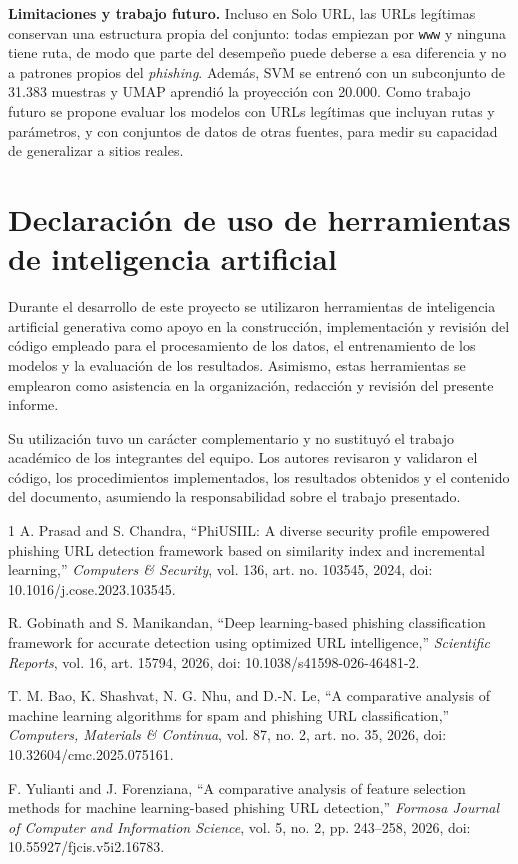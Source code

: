 \documentclass[journal]{IEEEtran}
\begin{document}
\textbf{Limitaciones y trabajo futuro.} Incluso en Solo URL, las URLs legítimas conservan una
estructura propia del conjunto: todas empiezan por \texttt{www} y ninguna tiene ruta, de modo que
parte del desempeño puede deberse a esa diferencia y no a patrones propios del \textit{phishing}.
Además, SVM se entrenó con un subconjunto de 31.383 muestras y UMAP aprendió la proyección con
20.000. Como trabajo futuro se propone evaluar los modelos con URLs legítimas que incluyan rutas y
parámetros, y con conjuntos de datos de otras fuentes, para medir su capacidad de generalizar a
sitios reales.


\section{Declaración de uso de herramientas de inteligencia artificial}
Durante el desarrollo de este proyecto se utilizaron herramientas de inteligencia
artificial generativa como apoyo en la construcción, implementación y revisión del
código empleado para el procesamiento de los datos, el entrenamiento de los modelos
y la evaluación de los resultados. Asimismo, estas herramientas se emplearon como
asistencia en la organización, redacción y revisión del presente informe.

Su utilización tuvo un carácter complementario y no sustituyó el trabajo académico
de los integrantes del equipo. Los autores revisaron y validaron el código, los
procedimientos implementados, los resultados obtenidos y el contenido del documento,
asumiendo la responsabilidad sobre el trabajo presentado.

\begin{thebibliography}{1}
A. Prasad and S. Chandra, ``PhiUSIIL: A diverse security profile empowered phishing URL
detection framework based on similarity index and incremental learning,''
\emph{Computers \& Security}, vol. 136, art. no. 103545, 2024,
doi: 10.1016/j.cose.2023.103545.

R. Gobinath and S. Manikandan, ``Deep learning-based phishing classification framework for
accurate detection using optimized URL intelligence,'' \emph{Scientific Reports}, vol. 16,
art. 15794, 2026, doi: 10.1038/s41598-026-46481-2.

T. M. Bao, K. Shashvat, N. G. Nhu, and D.-N. Le, ``A comparative analysis of machine learning
algorithms for spam and phishing URL classification,'' \emph{Computers, Materials \& Continua},
vol. 87, no. 2, art. no. 35, 2026, doi: 10.32604/cmc.2025.075161.

F. Yulianti and J. Forenziana, ``A comparative analysis of feature selection methods for
machine learning-based phishing URL detection,'' \emph{Formosa Journal of Computer and
Information Science}, vol. 5, no. 2, pp. 243--258, 2026, doi: 10.55927/fjcis.v5i2.16783.
\end{thebibliography}
\end{document}
